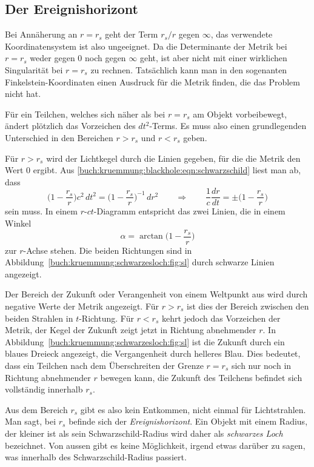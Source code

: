 \subsection{Der Ereignishorizont}
Bei Annäherung an $r=r_s$ geht der Term $r_s/r$ gegen $\infty$,
das verwendete Koordinatensystem ist also ungeeignet.
Da die Determinante der Metrik bei $r=r_s$ weder gegen $0$ noch
gegen $\infty$ geht, ist aber nicht mit einer wirklichen
Singularität bei $r=r_s$ zu rechnen.
Tatsächlich kann man in den sogenanten Finkelstein-Koordinaten
einen Ausdruck für die Metrik finden, die das Problem nicht hat.

Für ein Teilchen, welches sich näher als bei $r=r_s$ am Objekt
vorbeibewegt, ändert plötzlich das Vorzeichen des $dt^2$-Terms.
Es muss also einen grundlegenden Unterschied in den Bereichen
$r>r_s$ und $r<r_s$ geben.

Für $r>r_s$ wird der Lichtkegel durch die Linien gegeben, für
die die Metrik den Wert 0 ergibt.
%
Aus \eqref{buch:kruemmung:blackhole:eqn:schwarzschild} liest man
ab, dass 
\[
\biggl(1-\frac{r_s}{r}\biggr) c^2\, dt^2
=
\biggl(1-\frac{r_s}{r}\biggr)^{-1}\,dr^2
\qquad\Rightarrow\qquad
\frac1c\frac{dr}{dt}
=
\pm
\biggl(1-\frac{r_s}{r}\biggr)
\]
sein muss.
%
In einem $r$-$ct$-Diagramm entspricht das zwei Linien, die
in einem Winkel 
\[
\alpha = \arctan \biggl(1-\frac{r_s}{r}\biggr)
\]
zur $r$-Achse stehen.
Die beiden Richtungen sind in
Abbildung~\ref{buch:kruemmung:schwarzesloch:fig:sl}
durch schwarze Linien angezeigt.

Der Bereich der Zukunft oder Verangenheit von einem Weltpunkt aus
wird durch negative Werte der Metrik angezeigt.
Für $r>r_s$ ist dies der Bereich zwischen den beiden Strahlen in
$t$-Richtung.
Für $r<r_s$ kehrt jedoch das Vorzeichen der Metrik, der Kegel der
Zukunft zeigt jetzt in Richtung abnehmender $r$.
In Abbildung~\ref{buch:kruemmung:schwarzesloch:fig:sl} ist die
Zukunft durch ein blaues Dreieck angezeigt, die Vergangenheit durch
helleres Blau.
Dies bedeutet, dass ein Teilchen nach dem Überschreiten der Grenze $r=r_s$
sich nur noch in Richtung abnehmender $r$ bewegen kann, die Zukunft des
Teilchens befindet sich vollständig innerhalb $r_s$.

Aus dem Bereich $r_s$ gibt es also kein Entkommen, nicht einmal
für Lichtstrahlen.
Man sagt, bei $r_s$ befinde sich der \emph{Ereignishorizont}.
%
Ein Objekt mit einem Radius, der kleiner ist als sein Schwarzschild-Radius
wird daher als \emph{schwarzes Loch} bezeichnet.
%
Von aussen gibt es keine Möglichkeit, irgend etwas darüber zu sagen,
was innerhalb des Schwarzschild-Radius passiert.



